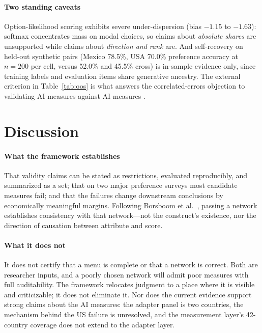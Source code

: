 \documentclass[11pt,letterpaper]{article}
\begin{document}
\paragraph{Two standing caveats} Option-likelihood scoring exhibits severe under-dispersion (bias $-1.15$ to
$-1.63$): softmax concentrates mass on modal choices, so claims about \emph{absolute shares} are unsupported
while claims about \emph{direction and rank} are. And self-recovery on held-out synthetic pairs (Mexico
78.5\%, USA 70.0\% preference accuracy at $n=200$ per cell, versus 52.0\% and 45.5\% cross) is in-sample
evidence only, since training labels and evaluation items share generative ancestry. The external criterion in
Table~\ref{tab:oos} is what answers the correlated-errors objection to validating AI measures against AI
measures \cite{dell2026}.

\section{Discussion}

\paragraph{What the framework establishes} That validity claims can be stated as restrictions, evaluated
reproducibly, and summarized as a set; that on two major preference surveys most candidate measures fail;
and that the failures change downstream conclusions by economically meaningful margins. Following Borsboom
et al.\ \cite{borsboom2004}, passing a network establishes consistency with that network---not the construct's
existence, nor the direction of causation between attribute and score.

\paragraph{What it does not} It does not certify that a menu is complete or that a network is correct. Both
are researcher inputs, and a poorly chosen network will admit poor measures with full auditability. The
framework relocates judgment to a place where it is visible and criticizable; it does not eliminate it. Nor
does the current evidence support strong claims about the AI measures: the adapter panel is two countries,
the mechanism behind the US failure is unresolved, and the measurement layer's 42-country coverage does not
extend to the adapter layer.
\end{document}
